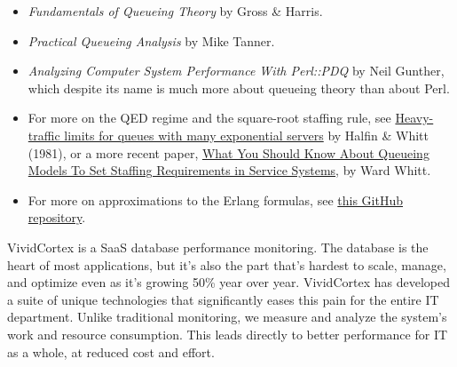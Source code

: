 \documentclass{vivid_layout_pdf}
\begin{document}
\begin{itemize}
\item {\itshape Fundamentals of Queueing Theory} by Gross \& Harris.
\item {\itshape Practical Queueing Analysis} by Mike Tanner.
\item {\itshape Analyzing Computer System Performance With Perl::PDQ} by Neil
Gunther, which despite its name is much more about queueing theory than about
Perl.
\item For more on the QED regime and the square-root staffing rule, see
\href{http://www.columbia.edu/~ww2040/HalfinWW1981.pdf}{Heavy-traffic limits for queues with many exponential servers} by Halfin \& Whitt (1981), or a more recent paper, \href{http://www.columbia.edu/~ww2040/shorter041907.pdf}{What You Should Know About Queueing Models To Set Staffing Requirements in Service Systems}, by Ward Whitt.
\item For more on approximations to the Erlang formulas, see
\href{https://github.com/VividCortex/approx-queueing-theory}{this GitHub
repository}.
\end{itemize}

\newpage

\begin{about}	%
VividCortex is a SaaS database performance monitoring. The database is the heart of most applications, but it's also the part that's hardest to scale, manage, and optimize even as it's growing 50\% year over year. VividCortex has developed a suite of unique technologies that significantly eases this pain for the entire IT department. Unlike traditional monitoring, we measure
and analyze the system's work and resource consumption. This leads directly to better performance for IT as a whole, at reduced cost and effort.
\end{about}
\makeresources	%
\end{document}
